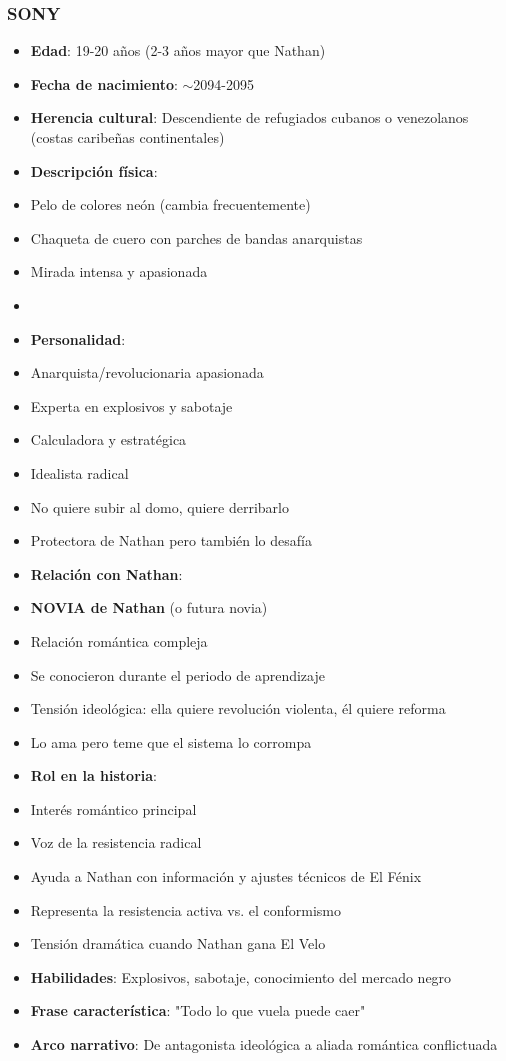 \documentclass[11pt,a4paper]{report}
\begin{document}
\subsubsection{SONY}
\begin{itemize}
  \item \textbf{Edad}: 19-20 años (2-3 años mayor que Nathan)
  \item \textbf{Fecha de nacimiento}: $\sim$2094-2095
  \item \textbf{Herencia cultural}: Descendiente de refugiados cubanos o venezolanos (costas caribeñas continentales)
  \item \textbf{Descripción física}: 
  \item Pelo de colores neón (cambia frecuentemente)
  \item Chaqueta de cuero con parches de bandas anarquistas
  \item Mirada intensa y apasionada
  \item [Más detalles a desarrollar]
  \item \textbf{Personalidad}: 
  \item Anarquista/revolucionaria apasionada
  \item Experta en explosivos y sabotaje
  \item Calculadora y estratégica
  \item Idealista radical
  \item No quiere subir al domo, quiere derribarlo
  \item Protectora de Nathan pero también lo desafía
  \item \textbf{Relación con Nathan}: 
  \item \textbf{NOVIA de Nathan} (o futura novia)
  \item Relación romántica compleja
  \item Se conocieron durante el periodo de aprendizaje
  \item Tensión ideológica: ella quiere revolución violenta, él quiere reforma
  \item Lo ama pero teme que el sistema lo corrompa
  \item \textbf{Rol en la historia}: 
  \item Interés romántico principal
  \item Voz de la resistencia radical
  \item Ayuda a Nathan con información y ajustes técnicos de El Fénix
  \item Representa la resistencia activa vs. el conformismo
  \item Tensión dramática cuando Nathan gana El Velo
  \item \textbf{Habilidades}: Explosivos, sabotaje, conocimiento del mercado negro
  \item \textbf{Frase característica}: "Todo lo que vuela puede caer"
  \item \textbf{Arco narrativo}: De antagonista ideológica a aliada romántica conflictuada

\end{itemize}
\end{document}
